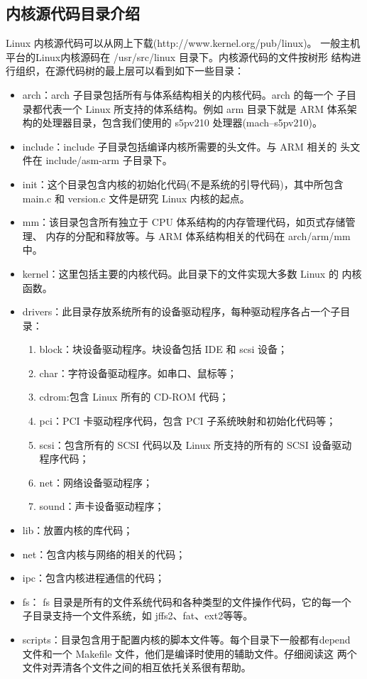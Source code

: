 \subsection{内核源代码目录介绍}
	Linux 内核源代码可以从网上下载(http://www.kernel.org/pub/linux)。
一般主机平台的Linux内核源码在 /usr/src/linux 目录下。内核源代码的文件按树形
结构进行组织，在源代码树的最上层可以看到如下一些目录：
\begin{itemize}
  \item arch：arch 子目录包括所有与体系结构相关的内核代码。arch 的每一个
		子目录都代表一个 Linux 所支持的体系结构。例如 arm 目录下就是 ARM
		体系架构的处理器目录，包含我们使用的 s5pv210 处理器(mach--s5pv210)。
  \item include：include 子目录包括编译内核所需要的头文件。与 ARM 相关的
		头文件在 include/asm-arm 子目录下。
  \item init：这个目录包含内核的初始化代码(不是系统的引导代码)，其中所包含
		main.c 和 version.c 文件是研究 Linux 内核的起点。
  \item mm：该目录包含所有独立于 CPU 体系结构的内存管理代码，如页式存储管理、
		内存的分配和释放等。与 ARM 体系结构相关的代码在 arch/arm/mm 中。
  \item kernel：这里包括主要的内核代码。此目录下的文件实现大多数 Linux 的
		内核函数。
  \item drivers：此目录存放系统所有的设备驱动程序，每种驱动程序各占一个子目录：
  \begin{enumerate}
  \item block：块设备驱动程序。块设备包括 IDE 和 scsi 设备；
  \item char：字符设备驱动程序。如串口、鼠标等；
  \item cdrom:包含 Linux 所有的 CD-ROM 代码；
  \item pci：PCI 卡驱动程序代码，包含 PCI 子系统映射和初始化代码等；
  \item scsi：包含所有的 SCSI 代码以及 Linux 所支持的所有的 SCSI 设备驱动
		程序代码；
  \item net：网络设备驱动程序；
  \item sound：声卡设备驱动程序；
  \end{enumerate}
  \item lib：放置内核的库代码；
  \item net：包含内核与网络的相关的代码；
  \item ipc：包含内核进程通信的代码；
  \item fs： fs 目录是所有的文件系统代码和各种类型的文件操作代码，它的每一个
		子目录支持一个文件系统，如 jffs2、fat、ext2等等。
  \item scripts：目录包含用于配置内核的脚本文件等。每个目录下一般都有depend
		文件和一个 Makefile 文件，他们是编译时使用的辅助文件。仔细阅读这
		两个文件对弄清各个文件之间的相互依托关系很有帮助。
\end{itemize}

